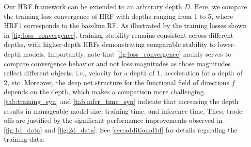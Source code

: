 \begin{table}[t]
\centering
{}
\caption{Inference time comparison for synthetic data using a varying NFE budget. For HRF2, we used sampling step combinations: $(1,5), (2,5), (5,10), (10,10)$. For HRF3, we used sampling step combinations: $(1,1,5), (1,2,5), (1,5,10), (2,5,10)$. For all experiments, we set our batch size to 100,000. } 
\label{tab:infer_time_syn}
\end{table}

Our HRF framework can be extended to an arbitrary depth $D$. Here, we compare the training loss convergence of HRF with depths ranging from 1 to 5, where HRF1 corresponds to the baseline RF. As illustrated by the training losses shown in \cref{fig:loss_convergence}, training stability remains consistent across different depths, with higher-depth HRFs demonstrating comparable stability to lower-depth models. Importantly, note that \cref{fig:loss_convergence} mainly serves to compare convergence behavior and not loss magnitudes as those magnitudes reflect different objects, i.e., velocity for a depth of 1, acceleration for a depth of 2, etc. Moreover, the deep net structure for the functional field of directions $f$ depends on the depth, which makes a comparison more challenging. 
\cref{tab:training_syn} and \cref{tab:infer_time_syn} indicate that increasing the depth results in manageable model size, training time, and inference time. These trade-offs are justified by the significant performance improvements observed in \cref{fig:1d_data} and \cref{fig:2d_data}. See \cref{sec:additional1d} for details regarding the training data. 


